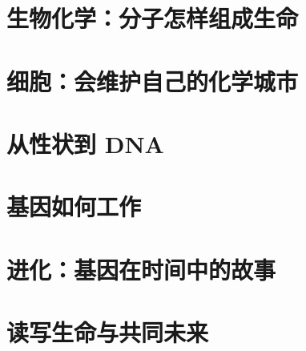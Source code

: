 \documentclass[12pt,openany,fontset=none,UTF8,scheme=chinese]{ctexbook}
\begin{document}
\part{生物化学：分子怎样组成生命}












\part{细胞：会维护自己的化学城市}










\part{从性状到 DNA}





\part{基因如何工作}










\part{进化：基因在时间中的故事}






\part{读写生命与共同未来}








\backmatter
\appendix






\end{document}
